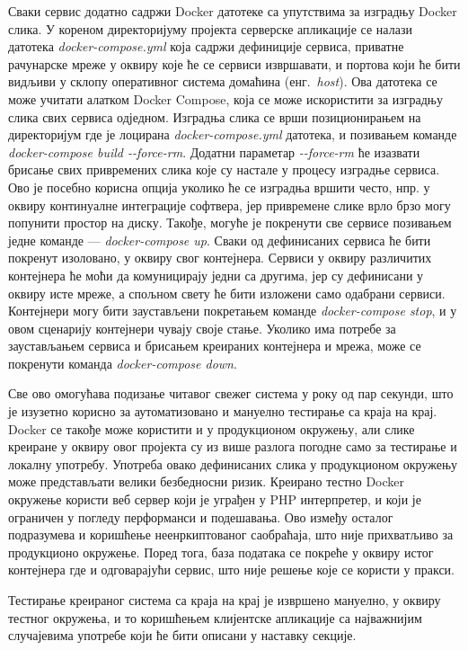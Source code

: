 \documentclass[12pt,oneside]{memoir}
\begin{document}
Сваки сервис додатно садржи Docker датотеке са упутствима за изградњу Docker слика. У кореном директоријуму пројекта серверске апликације се налази датотека \textit{docker-compose.yml} која садржи дефиниције сервиса, приватне рачунарске мреже у оквиру које ће се сервиси извршавати, и портова који ће бити видљиви у склопу оперативног система домаћина (енг.~\textit{host}). Ова датотека се може учитати алатком Docker Compose, која се може искористити за изградњу слика свих сервиса одједном. Изградња слика се врши позиционирањем на директоријум где је лоцирана \textit{docker-compose.yml} датотека, и позивањем команде \textit{docker-compose build -{}-force-rm}. Додатни параметар \textit{-{}-force-rm} ће изазвати брисање свих привремених слика које су настале у процесу изградње сервиса. Ово је посебно корисна опција уколико ће се изградња вршити често, нпр. у оквиру континуалне интеграције софтвера, јер привремене слике врло брзо могу попунити простор на диску. Такође, могуће је покренути све сервисе позивањем једне команде --- \textit{docker-compose up}. Сваки од дефинисаних сервиса ће бити покренут изоловано, у оквиру свог контејнера. Сервиси у оквиру различитих контејнера ће моћи да комуницирају једни са другима, јер су дефинисани у оквиру исте мреже, а спољном свету ће бити изложени само одабрани сервиси. Контејнери могу бити заустављени покретањем команде \textit{docker-compose stop}, и у овом сценарију контејнери чувају своје стање. Уколико има потребе за заустављањем сервиса и брисањем креираних контејнера и мрежа, може се покренути команда \textit{docker-compose down}.

Све ово омогућава подизање читавог свежег система у року од пар секунди, што је изузетно корисно за аутоматизовано и мануелно тестирање са краја на крај. Docker се такође може користити и у продукционом окружењу, али слике креиране у оквиру овог пројекта су из више разлога погодне само за тестирање и локалну употребу. Употреба овако дефинисаних слика у продукционом окружењу може представљати велики безбедносни ризик. Креирано тестно Docker окружење користи веб сервер који је уграђен у PHP интерпретер, и који је ограничен у погледу перформанси и подешавања. Ово између осталог подразумева и коришћење неенркиптованог саобраћаја, што није прихватљиво за продукционо окружење. Поред тога, база података се покреће у оквиру истог контејнера где и одговарајући сервис, што није решење које се користи у пракси.

Тестирање креираног система са краја на крај је извршено мануелно, у оквиру тестног окружења, и то коришћењем клијентске апликације са најважнијим случајевима употребе који ће бити описани у наставку секције.
\end{document}
